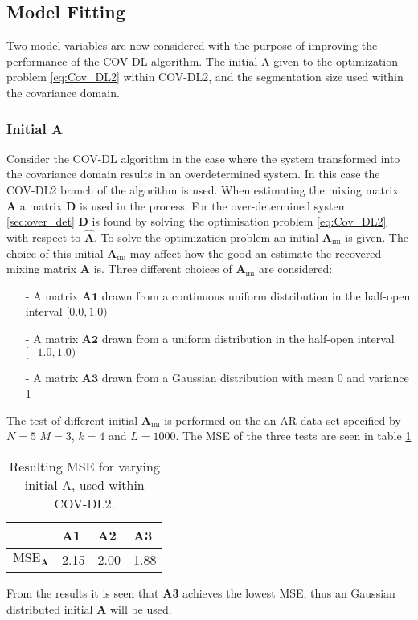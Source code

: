\subsection{Model Fitting}
Two model variables are now considered with the purpose of improving the performance of the COV-DL algorithm. The initial A given to the optimization problem \eqref{eq:Cov_DL2} within COV-DL2, and the segmentation size used within the covariance domain.   
\subsubsection*{Initial $\textbf{A}$}
Consider the COV-DL algorithm in the case where the system transformed into the covariance domain results in an overdetermined system. In this case the COV-DL2 branch of the algorithm is used. 
When estimating the mixing matrix $\mathbf{A}$ a matrix $\mathbf{D}$ is used in the process. For the over-determined system \ref{sec:over_det} $\mathbf{D}$ is found by solving the optimisation problem \eqref{eq:Cov_DL2} with respect to $\hat{\textbf{A}}$. To solve the optimization problem an initial $\mathbf{A}_{\text{ini}}$ is given. The choice of this initial $\mathbf{A}_{\text{ini}}$ may affect how the good an estimate the recovered mixing matrix $\mathbf{A}$ is.
Three different choices of $\mathbf{A}_{\text{ini}}$ are considered:
\begin{itemize}
\item[-] A matrix $\mathbf{A1}$ drawn from a continuous uniform distribution in the half-open interval $[0.0, 1.0)$
\item[-] A matrix $\mathbf{A2}$ drawn from a uniform distribution in the half-open interval $[-1.0, 1.0)$
\item[-] A matrix $\mathbf{A3}$ drawn from a Gaussian distribution with mean 0 and variance 1
\end{itemize}
The test of different initial $\mathbf{A}_{\text{ini}}$ is performed on the 
an AR data set specified by $N=5$ $M = 3$, $k = 4$ and $L = 1000$. 
The MSE of the three tests are seen in table \ref{tab:iniA} 
\begin{table}[H]
\centering
\begin{tabular}{|l|l|l|l|} 
\hline
                          & \textbf{A1} & \textbf{A2} & \textbf{A3} \\
\hline $\text{MSE}_{\mathbf{A}}$ &   2.15          & 2.00            & 1.88\\
\hline           
\end{tabular}
\caption{Resulting MSE for varying initial A, used within COV-DL2.}
\label{tab:iniA}
\end{table}
From the results it is seen that \textbf{A3} achieves the lowest MSE, thus an Gaussian distributed initial $\textbf{A}$ will be used.    

